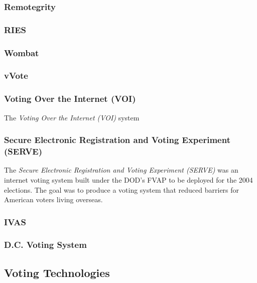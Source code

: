 \subsubsection{Remotegrity}

\subsubsection{RIES}

\subsubsection{Wombat}

\subsubsection{vVote}


\subsubsection{Voting Over the Internet (VOI)}
The \emph{Voting Over the Internet (VOI)} system

\subsubsection{Secure Electronic Registration and Voting Experiment (SERVE)}
The \emph{Secure Electronic Registration and Voting Experiment (SERVE)} was an
internet voting system built under the DOD's FVAP to be deployed for the 2004
elections. The goal was to produce a voting system that reduced barriers for
American voters living overseas.

\subsubsection{IVAS}

\subsubsection{D.C. Voting System}

\subsection{Voting Technologies}

